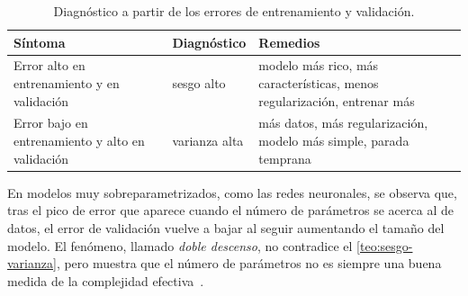 \begin{table}[h]
\centering\small
\caption{Diagnóstico a partir de los errores de entrenamiento y validación.}\label{tab:diagnostico}
\begin{tabular}{@{}>{\raggedright\arraybackslash}p{}>{\raggedright\arraybackslash}p{}>{\raggedright\arraybackslash}p{}@{}}
\toprule
Síntoma & Diagnóstico & Remedios \\
\midrule
Error alto en entrenamiento y en validación & sesgo alto & modelo más rico, más características, menos regularización, entrenar más \\
Error bajo en entrenamiento y alto en validación & varianza alta & más datos, más regularización, modelo más simple, parada temprana \\
\bottomrule
\end{tabular}
\end{table}

\begin{observacion}
En modelos muy sobreparametrizados, como las redes neuronales, se observa que, tras el pico de error que aparece cuando el número de parámetros se acerca al de datos, el error de validación vuelve a bajar al seguir aumentando el tamaño del modelo. El fenómeno, llamado \emph{doble descenso}, no contradice el \cref{teo:sesgo-varianza}, pero muestra que el número de parámetros no es siempre una buena medida de la complejidad efectiva~\cite[§8.2]{cs229}.
\end{observacion}

\addtocounter{definicion}{1}%

